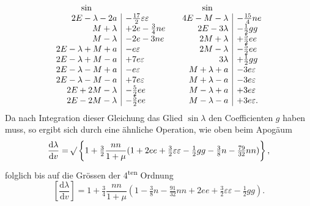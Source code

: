 \[
\begin{array}{r|l@{\qquad}r|l}
\multicolumn{1}{c}{\sin}& &\multicolumn{1}{c}{\sin}&\\
2E-\lambda-2a&-\tfrac{17}{2}\varepsilon\varepsilon
 &4E-M-\lambda&-\tfrac{15}{4}ne\\
M+\lambda&+2e-\tfrac34ne
 &2E-3\lambda&-\tfrac12gg\\
M-\lambda&-2e-3ne
 &2M+\lambda&+\tfrac52ee\\
2E-\lambda+M+a&-e\varepsilon
 &2M-\lambda&-\tfrac52ee\\
2E-\lambda+M-a&+7e\varepsilon
 &3\lambda&+\tfrac12gg\\
2E-\lambda-M+a&-e\varepsilon
 &M+\lambda+a&-3e\varepsilon\\
2E-\lambda-M-a&+7e\varepsilon
 &M+\lambda-a&-3e\varepsilon\\
2E+2M-\lambda&-\tfrac52ee
 &M-\lambda+a&+3e\varepsilon\\
2E-2M-\lambda&-\tfrac52ee
 &M-\lambda-a&+3e\varepsilon.
\end{array}
\]
\endgroup
\noindent Da nach Integration dieser Gleichung das Glied \(\sin\lambda\) den Coefficienten
\(g\) haben muss, so ergibt sich durch eine ähnliche Operation, wie oben beim
Apogäum
\[
\frac{\mathrm{d}\lambda}{\mathrm{d}v}
=\mathord{{}^{}\!\surd}\left\{1+\tfrac32\frac{nn}{1+\mu}
(1+2ee+\tfrac32\varepsilon\varepsilon-\tfrac12gg-\tfrac38n-\tfrac{79}{32}nn)\right\},
\]
\noindent folglich bis auf die Grössen der 4\textsuperscript{ten} Ordnung
\[
\left[\frac{\mathrm{d}\lambda}{\mathrm{d}v}\right]
=1+\tfrac34\frac{nn}{1+\mu}
(1-\tfrac38n-\tfrac{91}{32}nn+2ee+\tfrac32\varepsilon\varepsilon-\tfrac12gg).
\]
\clearpage
\endgroup
